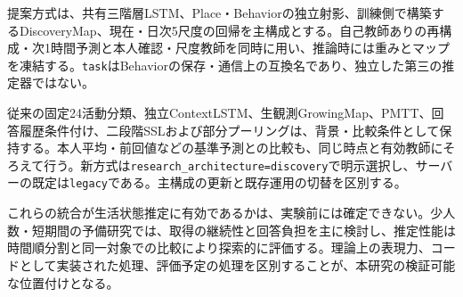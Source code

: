 提案方式は、共有三階層LSTM、Place・Behaviorの独立射影、訓練側で構築するDiscoveryMap、現在・日次5尺度の回帰を主構成とする。自己教師ありの再構成・次1時間予測と本人確認・尺度教師を同時に用い、推論時には重みとマップを凍結する。\texttt{task}はBehaviorの保存・通信上の互換名であり、独立した第三の推定器ではない。

従来の固定24活動分類、独立ContextLSTM、生観測GrowingMap、PMTT、回答履歴条件付け、二段階SSLおよび部分プーリングは、背景・比較条件として保持する。本人平均・前回値などの基準予測との比較も、同じ時点と有効教師にそろえて行う。新方式は\texttt{research\_architecture=discovery}で明示選択し、サーバーの既定は\texttt{legacy}である。主構成の更新と既存運用の切替を区別する。

これらの統合が生活状態推定に有効であるかは、実験前には確定できない。少人数・短期間の予備研究では、取得の継続性と回答負担を主に検討し、推定性能は時間順分割と同一対象での比較により探索的に評価する。理論上の表現力、コードとして実装された処理、評価予定の処理を区別することが、本研究の検証可能な位置付けとなる。
